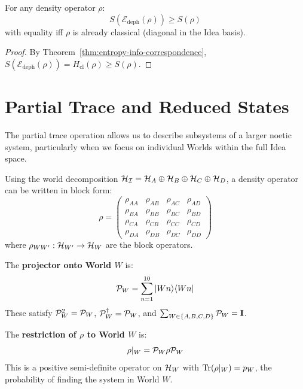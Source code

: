 \begin{proposition}
\label{prop:dephasing-entropy}
For any density operator $\rho$:
\[
S(\mathcal{E}_{\mathrm{deph}}(\rho)) \geq S(\rho)
\]
with equality iff $\rho$ is already classical (diagonal in the Idea basis).
\end{proposition}

\begin{proof}
By Theorem~\ref{thm:entropy-info-correspondence}, $S(\mathcal{E}_{\mathrm{deph}}(\rho)) = H_{\mathrm{cl}}(\rho) \geq S(\rho)$.
\end{proof}

\section{Partial Trace and Reduced States}
\label{sec:partial-trace}

The partial trace operation allows us to describe subsystems of a larger noetic system, particularly when we focus on individual Worlds within the full Idea space.

\begin{definition}
\label{def:world-decomp-density}
Using the world decomposition $\mathcal{H}_{\mathcal{I}} = \mathcal{H}_A \oplus \mathcal{H}_B \oplus \mathcal{H}_C \oplus \mathcal{H}_D$, a density operator can be written in block form:
\[
\rho = \begin{pmatrix}
\rho_{AA} & \rho_{AB} & \rho_{AC} & \rho_{AD} \\
\rho_{BA} & \rho_{BB} & \rho_{BC} & \rho_{BD} \\
\rho_{CA} & \rho_{CB} & \rho_{CC} & \rho_{CD} \\
\rho_{DA} & \rho_{DB} & \rho_{DC} & \rho_{DD}
\end{pmatrix}
\]
where $\rho_{WW'} : \mathcal{H}_{W'} \to \mathcal{H}_W$ are the block operators.
\end{definition}

\begin{definition}
\label{def:world-projector}
The \textbf{projector onto World $W$} is:
\[
\mathcal{P}_W = \sum_{n=1}^{10} |Wn\rangle\langle Wn|
\]
These satisfy $\mathcal{P}_W^2 = \mathcal{P}_W$, $\mathcal{P}_W^\dagger = \mathcal{P}_W$, and $\sum_{W \in \{A,B,C,D\}} \mathcal{P}_W = \mathbf{I}$.
\end{definition}

\begin{definition}
\label{def:world-restricted}
The \textbf{restriction of $\rho$ to World $W$} is:
\[
\rho|_W = \mathcal{P}_W \rho \mathcal{P}_W
\]
This is a positive semi-definite operator on $\mathcal{H}_W$ with $\mathrm{Tr}(\rho|_W) = p_W$, the probability of finding the system in World $W$.
\end{definition}


